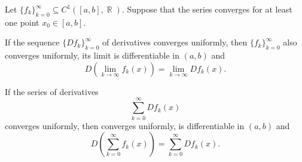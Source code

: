 \begin{corollary}\label{thm:derivative_limit_exchange}\mcite\cite[thm. 7.17]{Rudin1976}
  Let \( \{ f_k \}_{k=0}^\infty \subseteq C^1([a, b], \BbbR) \). Suppose that the series  converges for at least one point \( x_0 \in [a, b] \).

  \begin{thmenum}
     If the sequence \( \{ D f_k \}_{k=0}^\infty \) of derivatives converges uniformly, then \( \{ f_k \}_{k=0}^\infty \) also converges uniformly, its limit is differentiable in \( (a, b) \) and
    \begin{equation*}
      D\left(\lim_{k \to \infty} f_k(x) \right) = \lim_{k \to \infty} D f_k(x).
    \end{equation*}

     If the series of derivatives
    \begin{equation}\label{thm:derivative_limit_exchange/derivative_series}
      \sum_{k=0}^\infty D f_k(x)
    \end{equation}
    converges uniformly, then  converges uniformly, is differentiable in \( (a, b) \) and
    \begin{equation*}
      D\left(\sum_{k=0}^\infty f_k(x)\right) = \sum_{k=0}^\infty D f_k(x).
    \end{equation*}
  \end{thmenum}
\end{corollary}
